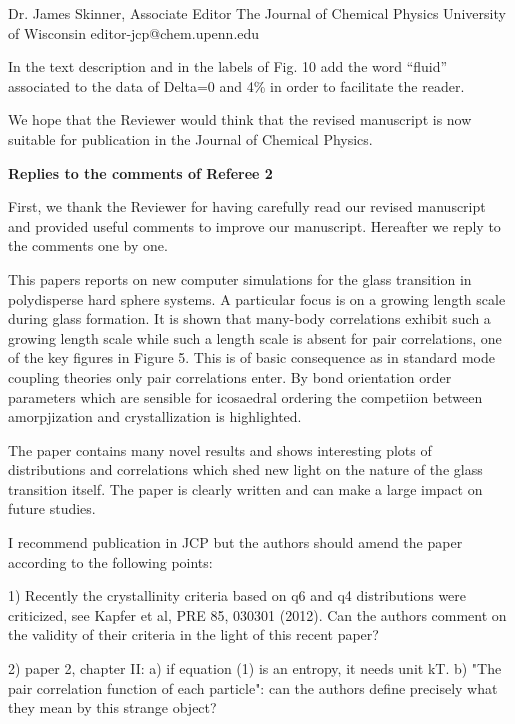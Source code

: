 \documentclass[a4paper, rebuttal, parskip=true, firsthead=false, fromemail=true, foldmarks=false]{scrlttr2}
\begin{document}
\begin{letter}{Dr. James Skinner, Associate Editor
The Journal of Chemical Physics
University of Wisconsin
editor-jcp@chem.upenn.edu }
\begin{quotationi}
In the text description and in the labels of Fig. 10 add the word ``fluid'' associated to the data of Delta=0 and 4\% in order to facilitate the reader.
\end{quotationi}

We hope that the Reviewer would think that the revised manuscript is now suitable for publication in the Journal of Chemical Physics. 


\textsf{\textbf{Replies to the comments of Referee 2}}

First, we thank the Reviewer for having carefully read our revised manuscript and provided useful comments to improve our manuscript. 
Hereafter we reply to the comments one by one.

\begin{quotationi}
This papers reports on new computer simulations for the glass transition
in polydisperse hard sphere systems. A particular focus is on a growing
length scale during glass formation. It is shown that many-body
correlations exhibit such a growing length scale while such a length scale
is absent for pair
correlations, one of the key figures in Figure 5.
This is of basic consequence as in standard mode
coupling theories only pair correlations enter.
By bond orientation
order parameters which are sensible for icosaedral ordering the competiion
between amorpjization and crystallization is highlighted.

The paper contains many novel results and shows interesting plots of
distributions and correlations which shed new light on the nature of
the glass transition itself. The paper is clearly written
and can make a large impact on future studies.

I recommend publication in JCP but the authors should amend the paper
according to the following points:

1) Recently the crystallinity criteria based on q6 and q4 distributions
were criticized, see Kapfer et al, PRE 85, 030301 (2012). Can the authors
comment on the validity of their criteria in the light of this recent paper?
\end{quotationi}

\begin{quotationi}
2) paper 2, chapter II: a) if equation (1) is an entropy, it needs unit kT.
b) "The pair correlation function of each particle": can the authors
define precisely what they mean by this strange object?
\end{quotationi}


\end{letter}
\end{document}
